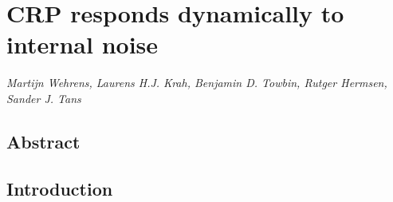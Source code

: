 



% 
%
% 



\chapter{CRP responds dynamically to internal noise}
\label{chapter:CRP}

\textit{Martijn Wehrens, Laurens H.J. Krah, Benjamin D. Towbin, Rutger Hermsen, Sander J. Tans}

\thispagestyle{empty}
\clearpage


\section{Abstract}

\section{Introduction}


